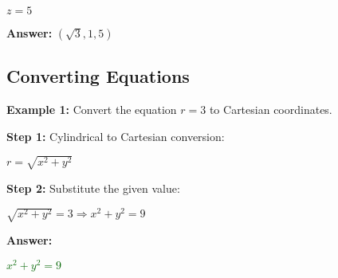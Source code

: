 \documentclass[10pt]{article}                               %
\begin{document}
\begin{defaultbox}
\begin{adjustwidth}{2em}{0pt}
\begin{adjustwidth}{2em}{0pt}
\begin{examplebox}
\begin{adjustwidth}{2em}{0pt}
                    \( z = 5 \)

                    \textbf{Answer:} \( \left(\sqrt{3}, 1, 5\right) \)

                \end{adjustwidth}

            \end{examplebox}

            \begin{examplebox}
            
                \subsection*{Converting Equations}
            
                \textbf{Example 1:} Convert the equation \( r = 3 \) to Cartesian coordinates.
                \vspace{0.5em}
            
                \begin{adjustwidth}{2em}{0pt}
            
                    \textbf{Step 1:} Cylindrical to Cartesian conversion:
            
                    \vspace{0.25em}
            
                    \( r = \sqrt{x^2 + y^2} \)
            
                    \vspace{0.5em}
            
                    \textbf{Step 2:} Substitute the given value:
            
                    \vspace{0.25em}
            
                    \( \sqrt{x^2 + y^2} = 3 \Rightarrow x^2 + y^2 = 9 \)
            
                    \vspace{0.5em}
            
                    \textbf{Answer:}
            
                    \vspace{0.25em}
            
                    \textcolor{darkgreen}{\( x^2 + y^2 = 9 \)}
            
                \end{adjustwidth}
            

\end{examplebox}
\end{adjustwidth}
\end{adjustwidth}
\end{defaultbox}
\end{document}
